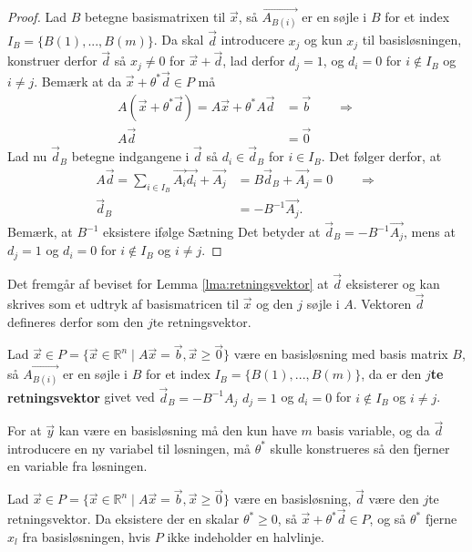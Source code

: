 \begin{proof}
Lad $B$ betegne basismatrixen til $\vec{x}$, så $\vec{A_{B(i)}}$ er en søjle i $B$ for et index $I_B =\{B(1),...,B(m)\}$. 
Da skal $\vec{d}$ introducere $x_j$ og kun $x_j$ til basisløsningen, konstruer derfor $\vec{d}$ så $x_j \neq 0$ for $\vec{x}+\vec{d}$, lad derfor $d_j=1$, og $d_i = 0$ for $i\notin I_B$ og $i \neq j$. 
Bemærk at da $\vec{x}+ \theta^*\vec{d} \in P$ må
\begin{align*}
	A(\vec{x}+\theta^* \vec{d}) = A\vec{x} + \theta^* A \vec{d}  & = \vec{b} \qquad \Rightarrow
	\\ A \vec{d} &= \vec{0}
\end{align*}
Lad nu $\vec{d}_B$ betegne indgangene i $\vec{d}$ så $d_i \in \vec{d}_B$ for $i \in I_B$. 
Det følger derfor, at
\begin{align*}
A \vec{d} = \sum_{i \in I_B} \vec{A_i} \vec{d_i} + \vec{A_j} &= B\vec{d}_B + \vec{A_j} = 0 \qquad \Rightarrow
\\ \vec{d}_B &= -B^{-1}\vec{A_j}.
\end{align*}
Bemærk, at $B^{-1}$ eksistere ifølge Sætning %
Det betyder at $\vec{d}_B = -B^{-1}\vec{A_j}$, mens at $d_j = 1$ og $d_i = 0$ for $i\notin I_B$ og $i \neq j$.
\end{proof}
Det fremgår af beviset for Lemma \ref{lma:retningsvektor} at $\vec{d}$ eksisterer og kan skrives som et udtryk af basismatricen til $\vec{x}$ og den $j$ søjle i $A$. 
Vektoren $\vec{d}$ defineres derfor som den $j$te retningsvektor. 
\begin{defn}[$j$te retningsvektor]
Lad $\vec{x} \in P =\{\vec{x}\in \mathds{R}^n \mid A\vec{x}= \vec{b}, \vec{x}\geq \vec{0}\}$ være en basisløsning med basis matrix $B$, så $\vec{A_{B(i)}}$ er en søjle i $B$ for et index $I_B =\{B(1),...,B(m)\}$, da er den \textbf{$j$te retningsvektor} givet ved $\vec{d}_B = - B^{-1} A_j$ $d_j = 1$ og $d_i = 0$ for $i\notin I_B$ og $i \neq j$.
\end{defn}
For at $\vec{y}$ kan være en basisløsning må den kun have $m$ basis variable, og da $\vec{d}$ introducere en ny variabel til løsningen, må $\theta^*$ skulle konstrueres så den fjerner en variable fra løsningen.
\begin{lma}
Lad $\vec{x} \in P =\{\vec{x}\in \mathds{R}^n \mid A\vec{x}= \vec{b}, \vec{x}\geq \vec{0}\}$ være en basisløsning, $\vec{d}$ være den $j$te retningsvektor.
Da eksistere der en skalar $\theta^* \geq 0$, så $\vec{x} + \theta^* \vec{d} \in P$, og så $\theta^* $ fjerne $x_l$ fra basisløsningen, hvis $P$ ikke indeholder en halvlinje.
\label{lma:skalar}
\end{lma}
